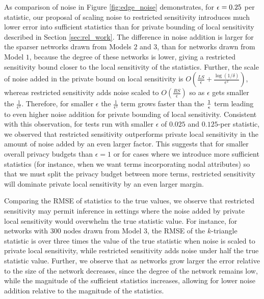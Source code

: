 As comparison of noise in Figure \ref{fig:edge_noise} demonstrates, for $\epsilon = 0.25$ per statistic, our proposal of scaling noise to restricted sensitivity introduces much lower error into sufficient statistics than for private bounding of local sensitivity described in Section \ref{sec:rel_work}. The difference in noise addition is larger for the sparser networks drawn from Models $2$ and $3$, than for networks drawn from Model $1$, because the degree of these networks is lower, giving a restricted sensitivity bound closer to the local sensitivity of the statistics. Further, the scale of noise added in the private bound on local sensitivity is $O\left(\frac{LS}{\epsilon} + \frac{\log(1/\delta)}{\epsilon^2}\right)$, whereas restricted sensitivity adds noise scaled to $O\left(\frac{RS}{\epsilon}\right)$ so as $\epsilon$ gets smaller the $\frac{1}{\epsilon^2}$. Therefore, for smaller $\epsilon$ the $\frac{1}{\epsilon^2}$ term grows faster than the $\frac{1}{\epsilon}$ term leading to even higher noise addition for private bounding of local sensitivity. Consistent with this observation, for tests run with smaller $\epsilon$ of $0.025$ and $0.125$-per statistic, we observed that restricted sensitivity outperforms private local sensitivity in the amount of noise added by an even larger factor. This suggests that for smaller overall privacy budgets than $\epsilon=1$ or for cases where we introduce more sufficient statistics (for instance, when we want terms incorporating nodal attributes) so that we must split the privacy budget between more terms, restricted sensitivity will dominate private local sensitivity by an even larger margin.

Comparing the RMSE of statistics to the true values, we observe that restricted sensitivity may permit inference in settings where the noise added by private local sensitivity would overwhelm the true statistic value. For instance, for networks with $300$ nodes drawn from Model $3$, the RMSE of the $k$-triangle statistic is over three times the value of the true statistic when noise is scaled to private local sensitivity, while restricted sensitivity adds noise under half the true statistic value. Further, we observe that as networks grow larger the error relative to the size of the network decreases, since the degree of the network remains low, while the magnitude of the sufficient statistics increases, allowing for lower noise addition relative to the magnitude of the statistics.

